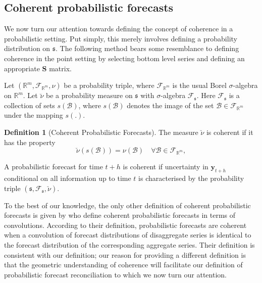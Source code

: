 \documentclass[12pt]{article}
\theoremstyle{definition}
\newtheorem{definition}{Definition}[section]
\begin{document}
\subsection{Coherent probabilistic forecasts}\label{subsec:cohprobf}

We now turn our attention towards defining the concept of coherence in a probabilistic setting.  Put simply, this merely involves defining a probability distribution on $\mathfrak{s}$.  The following method bears some resemblance to defining coherence in the point setting by selecting bottom level series and defining an appropriate $\bm{S}$ matrix. 


Let $(\mathbb{R}^m, \mathscr{F}_{\mathbb{R}^m}, \nu)$ be a probability triple, where $\mathscr{F}_{\mathbb{R}^m}$ is the usual Borel $\sigma$-algebra on $\mathbb{R}^m$. Let $\breve{\nu}$ be a probability measure on $\mathfrak{s}$ with $\sigma$-algebra $\mathscr{F}_{\mathfrak{s}}$. Here $\mathscr{F}_{\mathfrak{s}}$ is a collection of sets $s(\mathcal{B})$, where $s(\mathcal{B})$ denotes the image of the set $\mathcal{B}\in \mathscr{F}_{\mathbb{R}^m}$ under the mapping $s(.)$.

\begin{definition}[Coherent Probabilistic Forecasts]\label{def:cohprob}
	The measure $\breve{\nu}$ is coherent if it has the property
	\[
	\breve{\nu}(s(\mathcal{B})) = \nu(\mathcal{B}) \quad \forall \mathcal{B} \in \mathscr{F}_{\mathbb{R}^m},
	\]
\end{definition}

A probabilistic forecast for time $t+h$ is coherent if uncertainty in $\bm{y}_{t+h}$ conditional on all information up to time $t$ is characterised by the probability triple $(\mathfrak{s},\mathscr{F}_{\mathfrak{s}},\breve{\nu})$.

To the best of our knowledge, the only other definition of coherent probabilistic forecasts is given by \citet{BenTaieb2017} who define coherent probabilistic forecasts in terms of convolutions. According to their definition, probabilistic forecasts are coherent when a convolution of forecast distributions of disaggregate series is identical to the forecast distribution of the corresponding aggregate series. Their definition is consistent with our definition; our reason for providing a different definition is that the geometric understanding of coherence will facilitate our definition of probabilistic forecast reconciliation to which we now turn our attention.

%
%	
%
\end{document}
